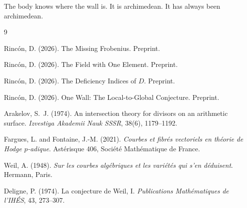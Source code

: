 \documentclass[12pt]{article}
\theoremstyle{definition}
\theoremstyle{remark}
\begin{document}
The body knows where the wall is.
It is archimedean.
It has always been archimedean.

\begin{thebibliography}{9}

Rinc\'on, D. (2026). The Missing Frobenius. Preprint.

Rinc\'on, D. (2026). The Field with One Element. Preprint.

Rinc\'on, D. (2026). The Deficiency Indices of $D$. Preprint.

Rinc\'on, D. (2026). One Wall: The Local-to-Global Conjecture. Preprint.

Arakelov, S.~J. (1974).
An intersection theory for divisors on an arithmetic surface.
\textit{Izvestiya Akademii Nauk SSSR}, 38(6), 1179--1192.

Fargues, L. and Fontaine, J.-M. (2021).
\textit{Courbes et fibrés vectoriels en théorie de Hodge $p$-adique}.
Astérisque 406, Société Mathématique de France.

Weil, A. (1948).
\textit{Sur les courbes algébriques et les variétés qui s'en déduisent}.
Hermann, Paris.

Deligne, P. (1974).
La conjecture de Weil, I.
\textit{Publications Mathématiques de l'IHÉS}, 43, 273--307.

\end{thebibliography}
\end{document}
